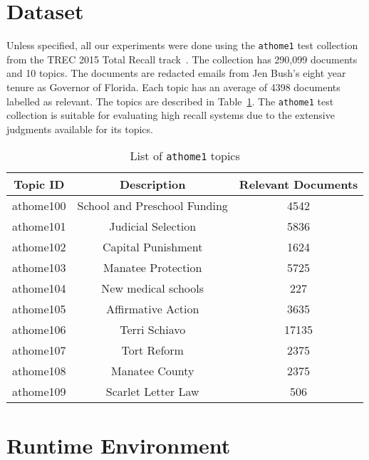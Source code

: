 \label{chap:dataset}

\section{Dataset}
Unless specified, all our experiments were done using the \texttt{athome1} test
collection from the TREC 2015 Total Recall track~\cite{roegiest2015trec}. The
collection has 290,099 documents and 10 topics. The documents are redacted
emails from Jen Bush's eight year tenure as Governor of Florida. Each topic has
an average of 4398 documents labelled as relevant. The topics are described in
Table~\ref{tab:topics}. The \texttt{athome1} test collection is suitable for
evaluating high recall systems due to the extensive judgments available for its
topics.

\begin{table}[h]
\centering
\caption{List of \texttt{athome1} topics}
\label{tab:topics}
\begin{tabular}{|c|c|c|}
\hline
\textbf{Topic ID} & \textbf{Description} & \textbf{Relevant Documents} \\ \hline \hline
athome100 & School and Preschool Funding & 4542 \\ \hline
athome101 & Judicial Selection & 5836 \\ \hline
athome102 & Capital Punishment & 1624 \\ \hline
athome103 & Manatee Protection & 5725 \\ \hline
athome104 & New medical schools & 227 \\ \hline
athome105 & Affirmative Action & 3635 \\ \hline
athome106 & Terri Schiavo & 17135 \\ \hline
athome107 & Tort Reform & 2375 \\ \hline
athome108 & Manatee County & 2375 \\ \hline
athome109 & Scarlet Letter Law & 506 \\ \hline
\end{tabular}
\end{table}


\section{Runtime Environment}

